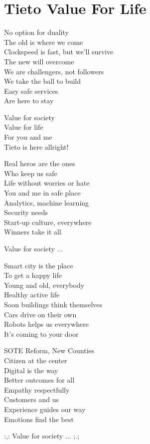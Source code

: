 \section{Tieto Value For Life}

No option for duality\\
The old is where we come\\
Clockspeed is fast, but we'll survive\\
The new will overcome\\
We are challengers, not followers\\
We take the ball to build\\
Easy safe services\\
Are here to stay

Value for society\\
Value for life\\
For you and me\\
Tieto is here allright!

Real heros are the ones\\
Who keep us safe\\
Life without worries or hate\\
You and me in safe place\\
Analytics, machine learning\\
Security needs\\
Start-up culture, everywhere\\
Winners take it all

Value for society ...

Smart city is the place\\
To get a happy life\\
Young and old, everybody\\
Healthy active life\\
Soon buildings think themselves\\
Cars drive on their own\\
Robots helps us everywhere\\
It's coming to your door

SOTE Reform, New Counties\\
Citizen at the center\\
Digital is the way\\
Better outcomes for all\\
Empathy respectfully\\
Customers and us\\
Experience guides our way\\
Emotions find the best

:,: Value for society ... ;.;